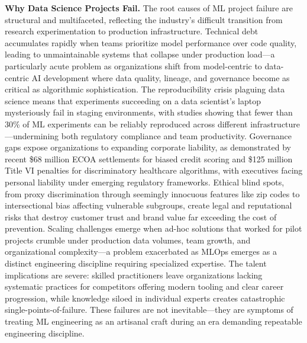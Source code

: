 \documentclass[11pt]{book}
\begin{document}
\textbf{Why Data Science Projects Fail.} The root causes of ML project failure are structural and multifaceted, reflecting the industry's difficult transition from research experimentation to production infrastructure. Technical debt accumulates rapidly when teams prioritize model performance over code quality, leading to unmaintainable systems that collapse under production load—a particularly acute problem as organizations shift from model-centric to data-centric AI development where data quality, lineage, and governance become as critical as algorithmic sophistication. The reproducibility crisis plaguing data science means that experiments succeeding on a data scientist's laptop mysteriously fail in staging environments, with studies showing that fewer than 30\% of ML experiments can be reliably reproduced across different infrastructure—undermining both regulatory compliance and team productivity. Governance gaps expose organizations to expanding corporate liability, as demonstrated by recent \$68 million ECOA settlements for biased credit scoring and \$125 million Title VI penalties for discriminatory healthcare algorithms, with executives facing personal liability under emerging regulatory frameworks. Ethical blind spots, from proxy discrimination through seemingly innocuous features like zip codes to intersectional bias affecting vulnerable subgroups, create legal and reputational risks that destroy customer trust and brand value far exceeding the cost of prevention. Scaling challenges emerge when ad-hoc solutions that worked for pilot projects crumble under production data volumes, team growth, and organizational complexity—a problem exacerbated as MLOps emerges as a distinct engineering discipline requiring specialized expertise. The talent implications are severe: skilled practitioners leave organizations lacking systematic practices for competitors offering modern tooling and clear career progression, while knowledge siloed in individual experts creates catastrophic single-points-of-failure. These failures are not inevitable—they are symptoms of treating ML engineering as an artisanal craft during an era demanding repeatable engineering discipline.
\end{document}
